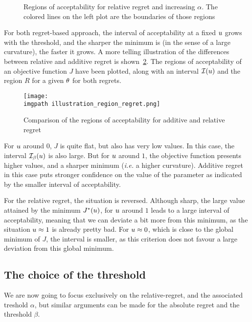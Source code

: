\documentclass[../../Main_ManuscritThese.tex]{subfiles}
\newcommand\imgpath{/home/victor/acadwriting/Manuscrit/Text/Chapter3/img/}
\begin{document}
\begin{figure}[ht]
  \centering
  
  \caption[Regions of $\alpha$-acceptability]{\label{fig:gamma_alpha_increasing} Regions of acceptability for relative regret and increasing $\alpha$. The colored lines on the left plot are the boundaries of those regions}
\end{figure}

For both regret-based approach, the interval of acceptability at a fixed $u$ grows with the threshold, and the sharper the minimum is (in the sense of a large curvature), the faster it grows.
A more telling illustration of the differences between relative and additive regret is shown~\cref{fig:illustration_region_regret}.
The regions of acceptability of an objective function $J$ have been plotted, along with an interval $\mathcal{I}(u)$ and the region $R$ for a given $\theta$ for both regrets.
\begin{figure}[ht]
  \centering
  \texttt{[image: \\imgpath illustration\_region\_regret.png]}
  \caption{\label{fig:illustration_region_regret} Comparison of the regions of acceptability for additive and relative regret}
\end{figure}
For $u$ around $0$, $J$ is quite flat, but also has very low values. In this case, the interval $\mathcal{I}_{\beta}(u)$ is also large. But for $u$ around $1$, the objective function presents higher values, and a sharper minimum (\emph{i.e.} a higher curvature). Additive regret in this case puts stronger confidence on the value of the parameter as indicated by the smaller interval of acceptability.

For the relative regret, the situation is reversed. Although sharp, the large value attained by the minimum $J^*(u)$, for $u$ around $1$ leads to a large interval of acceptability, meaning that we can deviate a bit more from this minimum, as the situation $u \approx 1$ is already pretty bad. For $u \approx 0$, which is close to the global minimum of $J$, the interval is smaller, as this criterion does not favour a large deviation from this global minimum.



\subsection{The choice of the threshold}
\label{sec:choice_threshold}
We are now going to focus exclusively on the relative-regret, and the associated treshold $\alpha$, but similar arguments can be made for the absolute regret and the threshold $\beta$.
\end{document}
